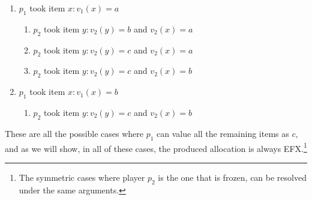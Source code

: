 \begin{enumerate}
    \item $p_1$ took item $x: v_1(x) = a$
    \begin{enumerate}
        \item $p_2$ took item $y:v_2(y) = b$ and $v_2(x) = a$ \label{enumerate:non-problematic-assigment-case-aba}
        \item $p_2$ took item $y: v_2(y) = c$ and $v_2(x) = a$ \label{enumerate:non-problematic-assigment-case-aca}
        \item $p_2$ took item $y: v_2(y) = c$ and $v_2(x) = b$ \label{enumerate:non-problematic-assigment-case-acb}
    \end{enumerate}
    \item $p_1$ took item $x: v_1(x) = b$
    \begin{enumerate}
        \item $p_2$ took item $y: v_2(y) = c$ and $v_2(x) = b$
        \label{enumerate:non-problematic-assigment-case-bcb}
    \end{enumerate}
\end{enumerate}
These are all the possible cases where $p_1$ can value all the remaining items as $c$, and as we will show, in all of these cases, the produced allocation is always EFX.\footnote{The symmetric cases where player $p_2$ is the one that is frozen, can be resolved under the same arguments.}
